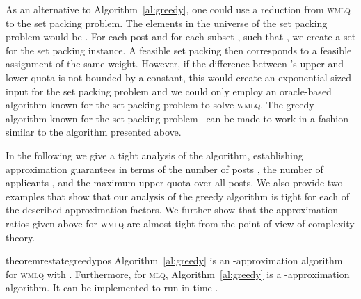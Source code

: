 \documentclass{llncs}
\begin{document}
\begin{remark}
As an alternative to Algorithm~\ref{al:greedy}, one could use a reduction from \textsc{wmlq} to the set packing problem. The elements in the universe of the set packing problem would be . For each post  and for each subset , such that , we create a set  for the set packing instance. A feasible set packing then corresponds to a feasible assignment of the same weight. However, if the difference between 's upper and lower quota is not bounded by a constant, this would create an exponential-sized input for the set packing problem and we could only employ an oracle-based algorithm known for the set packing problem to solve \textsc{wmlq}. The greedy algorithm known for the set packing problem~\cite{CH01} can be made to work in a fashion similar to the algorithm presented above.
\end{remark}

In the following we give a tight analysis of the algorithm, establishing approximation guarantees in terms of the number of posts , the number of applicants , and the maximum upper quota  over all posts. We also provide two examples that show that our analysis of the greedy algorithm is tight for each of the described approximation factors. We further show that the approximation ratios given above for \textsc{wmlq} are almost tight from the point of view of complexity theory.

\begin{restatable}{theorem}{restategreedypos}\label{thm:greedy-approximation}
  Algorithm~\ref{al:greedy} is an -approximation algorithm for \textsc{wmlq} with \linebreak \mbox{}. Furthermore, for \textsc{mlq}, Algorithm~\ref{al:greedy} is a -approximation algorithm. It can be implemented to run in time .
\end{restatable}
\end{document}
